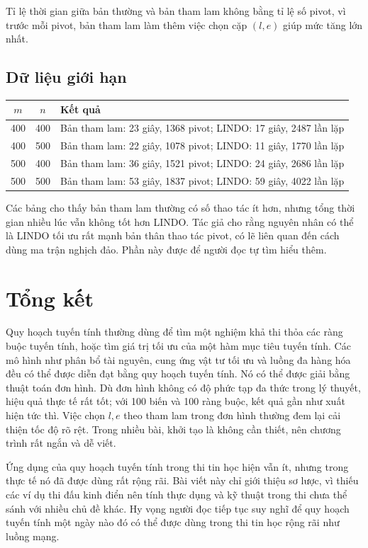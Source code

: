 \documentclass[11pt]{article}
\begin{document}
Tỉ lệ thời gian giữa bản thường và bản tham lam không bằng tỉ lệ số pivot,
vì trước mỗi pivot, bản tham lam làm thêm việc chọn cặp $(l,e)$ giúp mức tăng
lớn nhất.

\subsection*{Dữ liệu giới hạn}

\begin{center}
\begin{tabular}{c c l}
\hline
$m$ & $n$ & Kết quả\\
\hline
400 & 400 &
Bản tham lam: 23 giây, 1368 pivot; LINDO: 17 giây, 2487 lần lặp\\
400 & 500 &
Bản tham lam: 22 giây, 1078 pivot; LINDO: 11 giây, 1770 lần lặp\\
500 & 400 &
Bản tham lam: 36 giây, 1521 pivot; LINDO: 24 giây, 2686 lần lặp\\
500 & 500 &
Bản tham lam: 53 giây, 1837 pivot; LINDO: 59 giây, 4022 lần lặp\\
\hline
\end{tabular}
\end{center}

Các bảng cho thấy bản tham lam thường có số thao tác ít hơn, nhưng tổng thời
gian nhiều lúc vẫn không tốt hơn LINDO. Tác giả cho rằng nguyên nhân có thể
là LINDO tối ưu rất mạnh bản thân thao tác pivot, có lẽ liên quan đến cách
dùng ma trận nghịch đảo. Phần này được để người đọc tự tìm hiểu thêm.

\section*{Tổng kết}

Quy hoạch tuyến tính thường dùng để tìm một nghiệm khả thi thỏa các ràng
buộc tuyến tính, hoặc tìm giá trị tối ưu của một hàm mục tiêu tuyến tính.
Các mô hình như phân bổ tài nguyên, cung ứng vật tư tối ưu và luồng đa hàng
hóa đều có thể được diễn đạt bằng quy hoạch tuyến tính. Nó có thể được giải
bằng thuật toán đơn hình. Dù đơn hình không có độ phức tạp đa thức trong lý
thuyết, hiệu quả thực tế rất tốt; với 100 biến và 100 ràng buộc, kết quả gần
như xuất hiện tức thì. Việc chọn $l,e$ theo tham lam trong đơn hình thường
đem lại cải thiện tốc độ rõ rệt. Trong nhiều bài, khởi tạo là không cần
thiết, nên chương trình rất ngắn và dễ viết.

Ứng dụng của quy hoạch tuyến tính trong thi tin học hiện vẫn ít, nhưng trong
thực tế nó đã được dùng rất rộng rãi. Bài viết này chỉ giới thiệu sơ lược,
vì thiếu các ví dụ thi đấu kinh điển nên tính thực dụng và kỹ thuật trong
thi chưa thể sánh với nhiều chủ đề khác. Hy vọng người đọc tiếp tục suy nghĩ
để quy hoạch tuyến tính một ngày nào đó có thể được dùng trong thi tin học
rộng rãi như luồng mạng.
\end{document}
